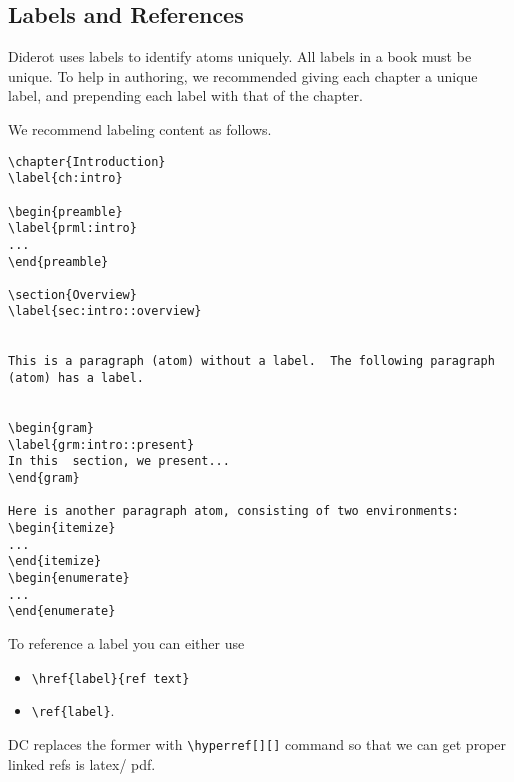 \subsection{Labels and References}

Diderot uses labels to identify atoms uniquely. All labels
in a book must be unique.  To help in authoring, we recommended giving
each chapter a unique label, and prepending each label with that of
the chapter.


\begin{example}

We recommend labeling content as follows.

\begin{lstlisting}
\chapter{Introduction}
\label{ch:intro}

\begin{preamble}
\label{prml:intro}
...
\end{preamble}

\section{Overview}
\label{sec:intro::overview}


This is a paragraph (atom) without a label.  The following paragraph (atom) has a label.


\begin{gram}
\label{grm:intro::present}
In this  section, we present...
\end{gram}

Here is another paragraph atom, consisting of two environments:
\begin{itemize}
...
\end{itemize}
\begin{enumerate}
...
\end{enumerate}

\end{lstlisting}
\end{example}

\begin{gram}[References]
To reference a label you can either use
\begin{itemize}
\item \lstinline`\href{label}{ref text}`
\item \lstinline`\ref{label}`.
\end{itemize}
%
DC replaces the former with \lstinline`\hyperref[][]` command so that we can get proper linked refs is latex/ pdf.
\end{gram}


